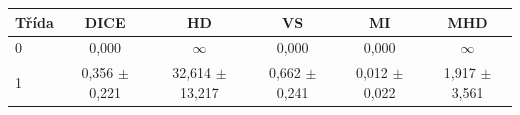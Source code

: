 \begin{tabular}{l c c c c c}
 \hline
Třída & DICE & HD & VS & MI & MHD \\ \hline
0 & 0,000 & $\infty$ & 0,000 & 0,000 & $\infty$ \\
1 & 0,356 $\pm$ 0,221 & 32,614 $\pm$ 13,217 & 0,662 $\pm$ 0,241 & 0,012 $\pm$ 0,022 & 1,917 $\pm$ 3,561 \\
\hline 
 \end{tabular}
